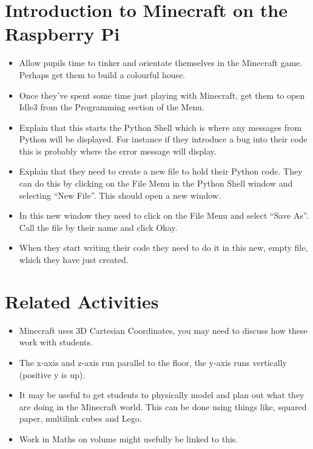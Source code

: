 \documentclass{geocraft-lesson-plan}
\begin{document}
\section*{Introduction to Minecraft on the Raspberry Pi}
\begin{itemize}
\item Allow pupils time to tinker and orientate themselves in the Minecraft game. Perhaps get them to build a colourful house. 
\item Once they've spent some time just playing with Minecraft, get them to open Idle3 from the Programming section of
  the Menu.
\item Explain that this starts the Python Shell which is where any messages from Python will be displayed. For instance
  if they introduce a bug into their code this is probably where the error message will display.
\item Explain that they need to create a new file to hold their Python code. They can do this by clicking on the File
  Menu in the Python Shell window and selecting ``New File''. This should open a new window. 
\item In this new window they need to click on the File Menu and select ``Save As''. Call the file by their name and
  click Okay.
\item When they start writing their code they need to do it in this new, empty file, which they have just created.
\end{itemize}

\section*{Related Activities}
\begin{itemize}
\item Minecraft uses 3D Cartesian Coordinates, you may need to discuss how these work with students.
\item The x-axis and z-axis run parallel to the floor, the y-axis runs vertically (positive y is up).
\item It may be useful to get students to physically model and plan out what they are doing in the Minecraft world. This
  can be done using things like, squared paper, multilink cubes and Lego. 
\item Work in Maths on volume might usefully be linked to this.
\end{itemize}
\end{document}
